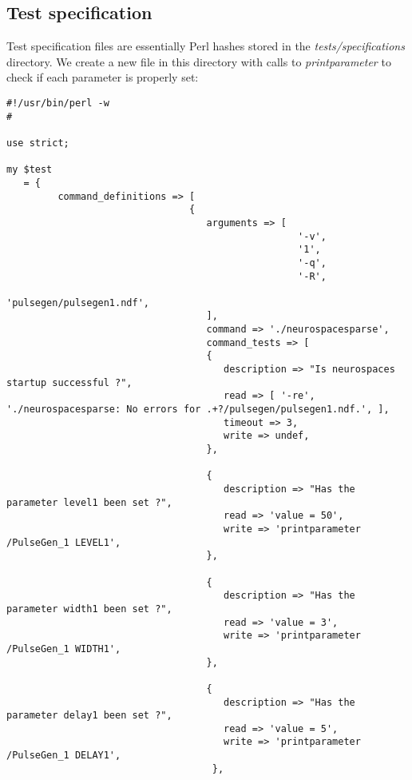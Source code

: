 \documentclass[12pt]{article}
\begin{document}
\subsection*{Test specification}

Test specification files are essentially Perl hashes stored in the {\it tests/specifications} directory. We create a new file in this directory with calls to {\it printparameter} to check if each parameter is properly set:
\begin{verbatim}
#!/usr/bin/perl -w
#

use strict;

my $test
   = {
         command_definitions => [
                                {
                                   arguments => [
                                                   '-v',
                                                   '1',
                                                   '-q',
                                                   '-R',
                                                   'pulsegen/pulsegen1.ndf',
                                   ],
                                   command => './neurospacesparse',
                                   command_tests => [
                                   {
                                      description => "Is neurospaces startup successful ?",
                                      read => [ '-re', './neurospacesparse: No errors for .+?/pulsegen/pulsegen1.ndf.', ],
                                      timeout => 3,
                                      write => undef,
                                   },

                                   {
                                      description => "Has the parameter level1 been set ?",
                                      read => 'value = 50',
                                      write => 'printparameter /PulseGen_1 LEVEL1',
                                   },

                                   {
                                      description => "Has the parameter width1 been set ?",
                                      read => 'value = 3',
                                      write => 'printparameter /PulseGen_1 WIDTH1',
                                   },

                                   {
                                      description => "Has the parameter delay1 been set ?",
                                      read => 'value = 5',
                                      write => 'printparameter /PulseGen_1 DELAY1',
                                    },


\end{verbatim}
\end{document}
